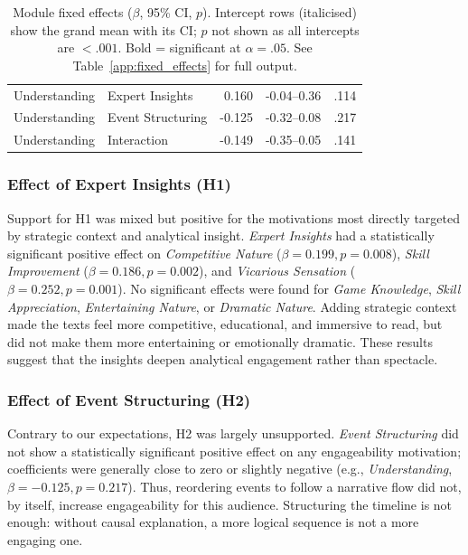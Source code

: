 \begin{table}[H]
\begin{tabular}{l l r r r}
  Understanding         & Expert Insights   & 0.160          & -0.04--0.36           & .114 \\
  Understanding         & Event Structuring & -0.125         & -0.32--0.08           & .217 \\
  Understanding         & Interaction       & -0.149         & -0.35--0.05           & .141 \\
  \bottomrule
\end{tabular}
\caption{Module fixed effects ($\beta$, 95\% CI, $p$). Intercept rows (italicised) show the grand mean with its CI; $p$ not shown as all intercepts are $< .001$. Bold = significant at $\alpha = .05$. See Table~\ref{app:fixed_effects} for full output.}
\label{tab:fixed_effects_short}
\end{table}

\subsubsection{Effect of Expert Insights (H1)}
Support for H1 was mixed but positive for the motivations most directly targeted by strategic context and analytical insight. \textit{Expert Insights} had a statistically significant positive effect on \textit{Competitive Nature} ($\beta=0.199, p=0.008$), \textit{Skill Improvement} ($\beta=0.186, p=0.002$), and \textit{Vicarious Sensation} ($\beta=0.252, p=0.001$). No significant effects were found for \textit{Game Knowledge}, \textit{Skill Appreciation}, \textit{Entertaining Nature}, or \textit{Dramatic Nature}. Adding strategic context made the texts feel more competitive, educational, and immersive to read, but did not make them more entertaining or emotionally dramatic. These results suggest that the insights deepen analytical engagement rather than spectacle.

\subsubsection{Effect of Event Structuring (H2)}
Contrary to our expectations, H2 was largely unsupported. \textit{Event Structuring} did not show a statistically significant positive effect on any engageability motivation; coefficients were generally close to zero or slightly negative (e.g., \textit{Understanding}, $\beta=-0.125, p=0.217$). Thus, reordering events to follow a narrative flow did not, by itself, increase engageability for this audience. Structuring the timeline is not enough: without causal explanation, a more logical sequence is not a more engaging one.

